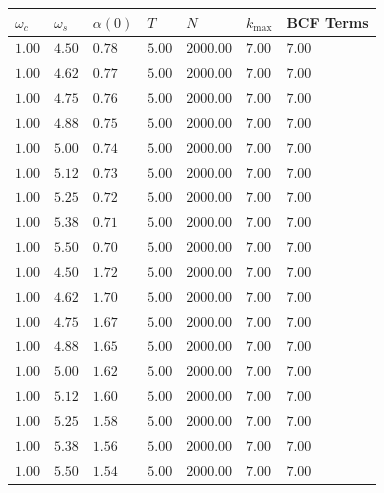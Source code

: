 \begin{table}[H]
  \centering
  \begin{tabular}{lllllll}
  \hline
   $ω_c$   & $ω_s$   & $α(0)$   & $T$    & $N$       & $k_{\mathrm{max}}$   & BCF Terms   \\
  \hline
   $1.00$  & $4.50$  & $0.78$   & $5.00$ & $2000.00$ & $7.00$               & $7.00$      \\
   $1.00$  & $4.62$  & $0.77$   & $5.00$ & $2000.00$ & $7.00$               & $7.00$      \\
   $1.00$  & $4.75$  & $0.76$   & $5.00$ & $2000.00$ & $7.00$               & $7.00$      \\
   $1.00$  & $4.88$  & $0.75$   & $5.00$ & $2000.00$ & $7.00$               & $7.00$      \\
   $1.00$  & $5.00$  & $0.74$   & $5.00$ & $2000.00$ & $7.00$               & $7.00$      \\
   $1.00$  & $5.12$  & $0.73$   & $5.00$ & $2000.00$ & $7.00$               & $7.00$      \\
   $1.00$  & $5.25$  & $0.72$   & $5.00$ & $2000.00$ & $7.00$               & $7.00$      \\
   $1.00$  & $5.38$  & $0.71$   & $5.00$ & $2000.00$ & $7.00$               & $7.00$      \\
   $1.00$  & $5.50$  & $0.70$   & $5.00$ & $2000.00$ & $7.00$               & $7.00$      \\
   $1.00$  & $4.50$  & $1.72$   & $5.00$ & $2000.00$ & $7.00$               & $7.00$      \\
   $1.00$  & $4.62$  & $1.70$   & $5.00$ & $2000.00$ & $7.00$               & $7.00$      \\
   $1.00$  & $4.75$  & $1.67$   & $5.00$ & $2000.00$ & $7.00$               & $7.00$      \\
   $1.00$  & $4.88$  & $1.65$   & $5.00$ & $2000.00$ & $7.00$               & $7.00$      \\
   $1.00$  & $5.00$  & $1.62$   & $5.00$ & $2000.00$ & $7.00$               & $7.00$      \\
   $1.00$  & $5.12$  & $1.60$   & $5.00$ & $2000.00$ & $7.00$               & $7.00$      \\
   $1.00$  & $5.25$  & $1.58$   & $5.00$ & $2000.00$ & $7.00$               & $7.00$      \\
   $1.00$  & $5.38$  & $1.56$   & $5.00$ & $2000.00$ & $7.00$               & $7.00$      \\
   $1.00$  & $5.50$  & $1.54$   & $5.00$ & $2000.00$ & $7.00$               & $7.00$      \\

\end{tabular}
\end{table}
